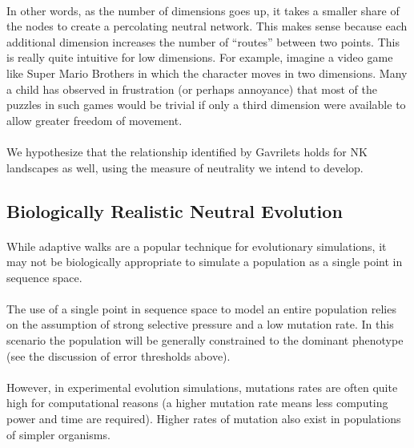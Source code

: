 \documentclass[12pt,letterpaper,titlepage]{article}
\begin{document}
\paragraph{}
In other words, as the number of dimensions goes up, it takes a smaller share
of the nodes to create a percolating neutral network. This makes sense because
each additional dimension increases the number of ``routes'' between two
points. This is really quite intuitive for low dimensions. For example, imagine
a video game like Super Mario Brothers in which the character moves in two
dimensions. Many a child has observed in frustration (or perhaps annoyance)
that most of the puzzles in such games would be trivial if only a third
dimension were available to allow greater freedom of movement.

\paragraph{}
We hypothesize that the relationship identified by Gavrilets holds for NK
landscapes as well, using the measure of neutrality we intend to develop.

\subsection{Biologically Realistic Neutral Evolution}


\paragraph{}
While adaptive walks are a popular technique for evolutionary simulations, it
may not be biologically appropriate to simulate a population as a single point
in sequence space.

\paragraph{}
The use of a single point in sequence space to model an entire population
relies on the assumption of strong selective pressure and a low mutation rate.
In this scenario the population will be generally constrained to the dominant
phenotype (see the discussion of error thresholds above).

\paragraph{}
However, in experimental evolution simulations, mutations rates are often quite
high for computational reasons (a higher mutation rate means less computing
power and time are required). Higher rates of mutation also exist in
populations of simpler organisms.
\end{document}
